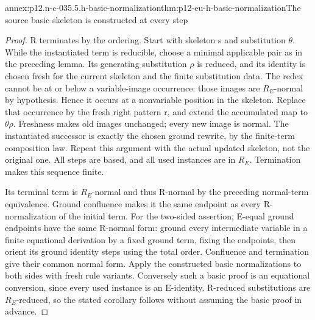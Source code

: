 \begin{annexitem}{annex:p12.n-c-035.5.h-basic-normalization}{thm:p12-eu-h-basic-normalization}{The source basic skeleton is constructed at every step}
\begin{proof}
R terminates by the ordering. Start with skeleton s and substitution
\(\theta\). While the instantiated term is reducible, choose a
minimal applicable pair as in the preceding lemma. Its generating
substitution \(\rho\) is reduced, and its identity is chosen
fresh for the current skeleton and the finite substitution data.
The redex cannot be at or below a variable-image occurrence:
those images are \(R_E\)-normal by hypothesis. Hence it occurs
at a nonvariable position in the skeleton. Replace that occurrence
by the fresh right pattern r, and extend the accumulated map to
\(\theta\rho\). Freshness makes old images unchanged; every
new image is normal. The instantiated successor is exactly the
chosen ground rewrite, by the finite-term composition law.
Repeat this argument with the actual updated skeleton, not the
original one. All steps are based, and all used instances are in
\(R_E\). Termination makes this sequence finite.

Its terminal term is \(R_E\)-normal and thus R-normal by the
preceding normal-term equivalence. Ground confluence makes it
the same endpoint as every R-normalization of the initial term.
For the two-sided assertion, E-equal ground endpoints have the
same R-normal form: ground every intermediate variable in a finite
equational derivation by a fixed ground term, fixing the endpoints,
then orient its ground identity steps using the total order.
Confluence and termination give their common normal form. Apply
the constructed basic normalizations to both sides with fresh
rule variants. Conversely such a basic proof is an equational
conversion, since every used instance is an E-identity.
R-reduced substitutions are \(R_E\)-reduced, so the stated
corollary follows without assuming the basic proof in advance.
\end{proof}
\end{annexitem}


